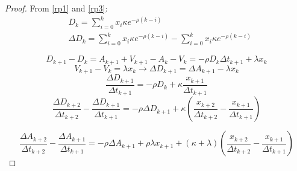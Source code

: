 \begin{appendices}
\begin{proof}
        From \eqref{rp1} and \eqref{rp3}:
        \begin{align} \label{rp3}
                & D_k = \sum _{i=0} ^k x_i \kappa e^{- \rho (k - i)} \\
                & \Delta D_k = \sum _{i=0} ^k x_i \kappa e^{- \rho (k - i)} - \sum _{i=0} ^k x_i \kappa e^{- \rho (k - i)}
        \end{align}


        \[ D_{k+1} - D_k = A_{k+1} + V_{k+1} - A_{k} - V_{k} = -\rho D_k \Delta t_{k+1} + \lambda x_{k} \]
        \[ V_{k+1} - V_k = \lambda x_{k} \rightarrow \Delta D_{k+1} = \Delta A_{k+1} - \lambda x_k \] 
        \[ \frac{\Delta D_{k+1}}{\Delta t_{k+1}} = - \rho D_k + \kappa \frac{x_{k+1}}{\Delta t_{k+1}} \] 
        \[ \frac{\Delta D_{k+2}}{\Delta t_{k+2}} - \frac{\Delta D_{k+1}}{\Delta t_{k+1}} 
            = - \rho \Delta D_{k+1} + \kappa ( \frac{x_{k+2}}{\Delta t_{k+2}} - \frac{x_{k+1}}{\Delta t_{k+1}}) \] 
        
        \[ \frac{\Delta A_{k+2}}{\Delta t_{k+2}} - \frac{\Delta A_{k+1}}{\Delta t_{k+1}} 
            = - \rho \Delta A_{k+1} + \rho \lambda x_{k+1} + (\kappa + \lambda) (\frac{x_{k+2}}{\Delta t_{k+2}} - \frac{x_{k+1}}{\Delta t_{k+1}}) \] 
       

\end{proof}
	
\end{appendices}   %